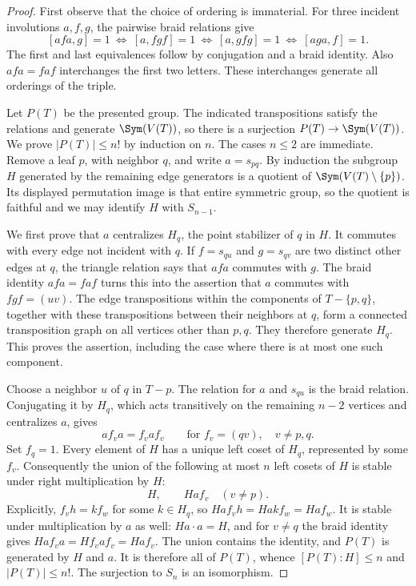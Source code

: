 \begin{proof}
First observe that the choice of ordering is immaterial. For three
incident involutions $a,f,g$, the pairwise braid relations give
\[
 [afa,g]=1\ \Longleftrightarrow\ [a,fgf]=1
 \ \Longleftrightarrow\ [a,gfg]=1
 \ \Longleftrightarrow\ [aga,f]=1.
\]
The first and last equivalences follow by conjugation and a braid
identity. Also $afa=faf$ interchanges the first two letters.
These interchanges generate all orderings of the triple.

Let $P(T)$ be the presented group. The indicated transpositions satisfy
the relations and generate $\Sym(V(T))$, so there is a surjection
$P(T)\to\Sym(V(T))$. We prove $|P(T)|\leq n!$ by induction on $n$.
The cases $n\leq2$ are immediate. Remove a leaf $p$, with neighbor $q$,
and write $a=s_{pq}$. By induction the subgroup $H$ generated by the
remaining edge generators is a quotient of $\Sym(V(T)\setminus\{p\})$.
Its displayed permutation image is that entire symmetric group, so the
quotient is faithful and we may identify $H$ with $S_{n-1}$.

We first prove that $a$ centralizes $H_q$, the point stabilizer of $q$
in $H$. It commutes with every edge not incident with $q$. If
$f=s_{qu}$ and $g=s_{qv}$ are two distinct other edges at $q$, the
triangle relation says that $afa$ commutes with $g$. The braid
identity $afa=faf$ turns this into the assertion that $a$ commutes
with $fgf=(uv)$. The edge transpositions within the components of
$T-\{p,q\}$, together with these transpositions between their neighbors
at $q$, form a connected transposition graph on all vertices other than
$p,q$. They therefore generate $H_q$. This proves the assertion,
including the case where there is at most one such component.

Choose a neighbor $u$ of $q$ in $T-p$. The relation for $a$ and
$s_{qu}$ is the braid relation. Conjugating it by $H_q$, which acts
transitively on the remaining $n-2$ vertices and centralizes $a$, gives
\[
 af_va=f_vaf_v\qquad\text{for }f_v=(qv),\quad v\ne p,q.
\]
Set $f_q=1$. Every element of $H$ has a unique left coset of $H_q$,
represented by some $f_v$. Consequently the union of the following
at most $n$ left cosets of $H$ is stable under right multiplication by
$H$:
\[
 H,\qquad Ha f_v\quad(v\ne p).
\]
Explicitly, $f_vh=kf_w$ for some $k\in H_q$, so
$Ha f_vh=Ha kf_w=Ha f_w$. It is stable under multiplication by $a$
as well: $Ha\cdot a=H$, and for $v\ne q$ the braid identity gives
$Ha f_va=Hf_va f_v=Ha f_v$.
The union contains the identity, and $P(T)$ is generated by $H$ and
$a$. It is therefore all of $P(T)$, whence $[P(T):H]\leq n$ and
$|P(T)|\leq n!$. The surjection to $S_n$ is an isomorphism.
\end{proof}

